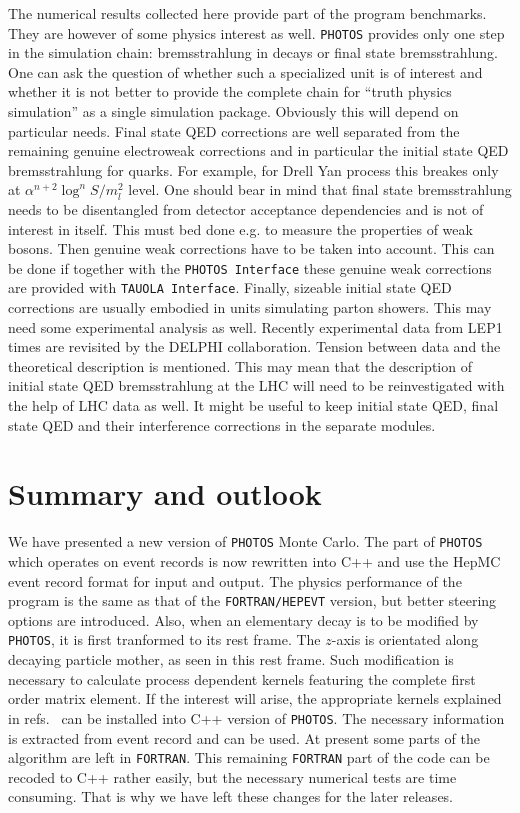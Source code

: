 \documentclass[]{Photos_interface_design}
\begin{document}
The numerical results collected here provide part of the program benchmarks. 
They are however of  some physics interest as well.
 {\tt PHOTOS} provides only one step in the simulation chain: 
bremsstrahlung in decays or final state bremsstrahlung. One can ask 
the question of whether such a specialized unit is of interest and whether it is not better 
to provide the complete chain for ``truth physics simulation'' as a single simulation package. Obviously this will
depend on particular needs. Final state QED corrections are 
well separated from the remaining genuine electroweak corrections and 
in particular the initial state QED bremsstrahlung for quarks. For example, for
Drell Yan process this breakes only at $\alpha^{n+2}\log^{n}{S/m_l^{2}}$ level.
One should bear in mind that final state bremsstrahlung 
needs to be disentangled from detector acceptance dependencies and is not of 
interest in itself. This must bed done e.g. to measure the properties of weak bosons.
Then genuine weak corrections have to be taken into account.
This can be done if together with the {\tt PHOTOS Interface}
these genuine weak corrections are provided with {\tt TAUOLA Interface}.
Finally, sizeable initial state QED corrections are usually embodied in  units 
simulating parton showers. This may need some experimental analysis as well. 
Recently experimental data from LEP1 times are revisited \cite{Abdallah:2010tk} 
by the DELPHI collaboration. Tension between data and the theoretical description is 
mentioned. This may mean that the description of initial state QED bremsstrahlung 
at the LHC will need to be reinvestigated with the help of LHC data as well.
It might be useful to keep initial state QED, final state QED and their interference corrections in the separate modules.

\section{Summary and outlook}
\label{sec:summary}
We have presented a new version  of {\tt PHOTOS} Monte Carlo. The part of 
{\tt PHOTOS} which operates on 
event records is now rewritten into C++ and use the HepMC event record 
format for input and output. The physics performance of the program is the
same as that of the {\tt FORTRAN/HEPEVT} version, but better steering options are introduced. 
Also, when an elementary decay is to be modified by {\tt PHOTOS}, 
it is first tranformed to its rest frame. The $z$-axis is orientated along decaying particle mother, as seen in this rest  frame. Such modification is 
necessary to calculate process dependent kernels
featuring the complete first order matrix element. If the interest will arise,
the appropriate kernels explained in
refs.~\cite{Golonka:2006tw,Nanava:2006vv,Nanava:2009vg} can be installed
into  C++ version of {\tt PHOTOS}. The necessary information is extracted
from event record and can be used.
At present some parts of the algorithm are left in {\tt FORTRAN}.
 This remaining {\tt FORTRAN} part of the code 
can be recoded to C++ rather easily, but the necessary numerical tests 
are time consuming. That is why we have left these changes for the later 
releases. 
\end{document}
